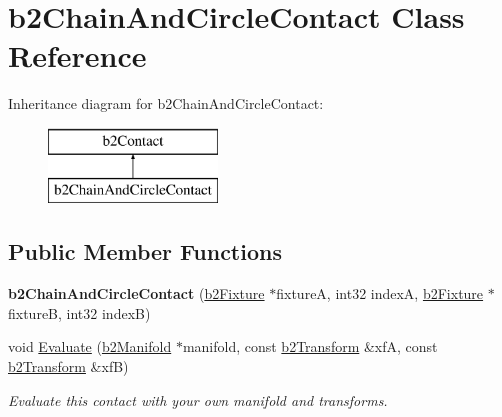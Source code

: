 \hypertarget{classb2_chain_and_circle_contact}{\section{b2\-Chain\-And\-Circle\-Contact Class Reference}
\label{classb2_chain_and_circle_contact}
}
Inheritance diagram for b2\-Chain\-And\-Circle\-Contact\-:\begin{figure}[H]
\begin{center}
\leavevmode
\includegraphics[height=2.000000cm]{classb2_chain_and_circle_contact}
\end{center}
\end{figure}
\subsection*{Public Member Functions}
\begin{DoxyCompactItemize}
\item 
\hypertarget{classb2_chain_and_circle_contact_a7303997b9af2b859346b4fc4d7e107d5}{{\bfseries b2\-Chain\-And\-Circle\-Contact} (\hyperlink{classb2_fixture}{b2\-Fixture} $\ast$fixture\-A, int32 index\-A, \hyperlink{classb2_fixture}{b2\-Fixture} $\ast$fixture\-B, int32 index\-B)}\label{classb2_chain_and_circle_contact_a7303997b9af2b859346b4fc4d7e107d5}

\item 
\hypertarget{classb2_chain_and_circle_contact_afe52ebd870f24cbecedd1db662705f12}{void \hyperlink{classb2_chain_and_circle_contact_afe52ebd870f24cbecedd1db662705f12}{Evaluate} (\hyperlink{structb2_manifold}{b2\-Manifold} $\ast$manifold, const \hyperlink{structb2_transform}{b2\-Transform} \&xf\-A, const \hyperlink{structb2_transform}{b2\-Transform} \&xf\-B)}\label{classb2_chain_and_circle_contact_afe52ebd870f24cbecedd1db662705f12}

\begin{DoxyCompactList}\small\item\em Evaluate this contact with your own manifold and transforms. \end{DoxyCompactList}\end{DoxyCompactItemize}
